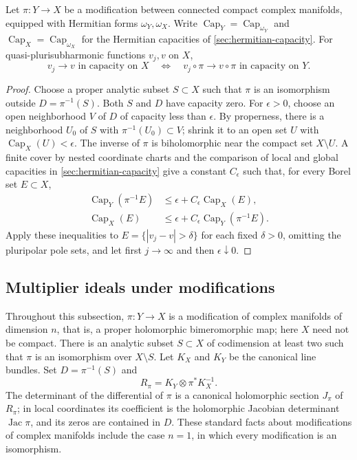 \begin{lemma}\label{lem:modification-capacity-pullback}
Let $\pi\colon Y\to X$ be a modification between connected compact complex manifolds, equipped with Hermitian forms $\omega_Y,\omega_X$. Write $\operatorname{Cap}_Y=\operatorname{Cap}_{\omega_Y}$ and $\operatorname{Cap}_X=\operatorname{Cap}_{\omega_X}$ for the Hermitian capacities of \cref{sec:hermitian-capacity}. For quasi-plurisubharmonic functions $v_j,v$ on $X$,
\[
 v_j\longrightarrow v\text{ in capacity on }X
 \quad\Longleftrightarrow\quad
 v_j\circ\pi\longrightarrow v\circ\pi\text{ in capacity on }Y.
\]
\end{lemma}
\begin{proof}
Choose a proper analytic subset $S\subset X$ such that $\pi$ is an isomorphism outside $D=\pi^{-1}(S)$. Both $S$ and $D$ have capacity zero. For $\epsilon>0$, choose an open neighborhood $V$ of $D$ of capacity less than $\epsilon$. By properness, there is a neighborhood $U_0$ of $S$ with $\pi^{-1}(U_0)\subset V$; shrink it to an open set $U$ with $\operatorname{Cap}_X(U)<\epsilon$. The inverse of $\pi$ is biholomorphic near the compact set $X\setminus U$. A finite cover by nested coordinate charts and the comparison of local and global capacities in \cref{sec:hermitian-capacity} give a constant $C_\epsilon$ such that, for every Borel set $E\subset X$,
\[
 \begin{split}
 \operatorname{Cap}_Y(\pi^{-1}E)&\leq\epsilon+C_\epsilon\operatorname{Cap}_X(E),\\
 \operatorname{Cap}_X(E)&\leq\epsilon+C_\epsilon\operatorname{Cap}_Y(\pi^{-1}E).
 \end{split}
\]
Apply these inequalities to $E=\{|v_j-v|>\delta\}$ for each fixed $\delta>0$, omitting the pluripolar pole sets, and let first $j\to\infty$ and then $\epsilon\downarrow0$.
\end{proof}

\subsection{Multiplier ideals under modifications}
\label{sec:psh-birational-ideals}

Throughout this subsection, $\pi\colon Y\to X$ is a modification of complex manifolds of dimension $n$, that is, a proper holomorphic bimeromorphic map; here $X$ need not be compact. There is an analytic subset $S\subset X$ of codimension at least two such that $\pi$ is an isomorphism over $X\setminus S$. Let $K_X$ and $K_Y$ be the canonical line bundles. Set $D=\pi^{-1}(S)$ and
\[
 R_\pi=K_Y\otimes\pi^*K_X^{-1}.
\]
The determinant of the differential of $\pi$ is a canonical holomorphic section $J_\pi$ of $R_\pi$; in local coordinates its coefficient is the holomorphic Jacobian determinant $\operatorname{Jac}\pi$, and its zeros are contained in $D$. These standard facts about modifications of complex manifolds include the case $n=1$, in which every modification is an isomorphism.

